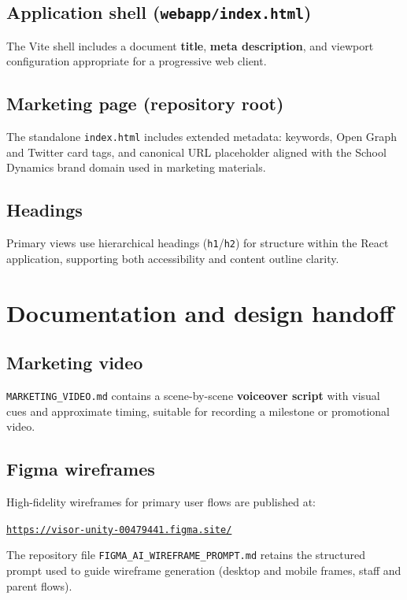 \documentclass[11pt,a4paper]{article}
\newcommand{\WireframesURL}{https://visor-unity-00479441.figma.site/}
\begin{document}
\subsection{Application shell (\texttt{webapp/index.html})}
The Vite shell includes a document \textbf{title}, \textbf{meta description}, and viewport configuration appropriate for a progressive web client.

\subsection{Marketing page (repository root)}
The standalone \texttt{index.html} includes extended metadata: keywords, Open Graph and Twitter card tags, and canonical URL placeholder aligned with the School Dynamics brand domain used in marketing materials.

\subsection{Headings}
Primary views use hierarchical headings (\texttt{h1}/\texttt{h2}) for structure within the React application, supporting both accessibility and content outline clarity.

\section{Documentation and design handoff}

\subsection{Marketing video}
\texttt{MARKETING\_VIDEO.md} contains a scene-by-scene \textbf{voiceover script} with visual cues and approximate timing, suitable for recording a milestone or promotional video.

\subsection{Figma wireframes}
High-fidelity wireframes for primary user flows are published at:

\begin{center}
\href{\WireframesURL}{\texttt{\WireframesURL}}
\end{center}

\noindent
The repository file \texttt{FIGMA\_AI\_WIREFRAME\_PROMPT.md} retains the structured prompt used to guide wireframe generation (desktop and mobile frames, staff and parent flows).
\end{document}
